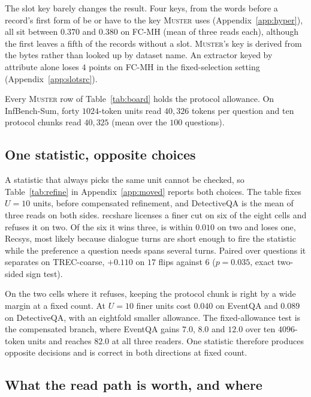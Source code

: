\documentclass{article}
\newcommand{\sys}{\textsc{Muster}}
\newcommand{\cov}{\textsf{recshare}}
\begin{document}
The slot key barely changes the result. Four keys, from the words before a record's first form of be or have
to the key \sys{} uses (Appendix~\ref{app:hyper}), all sit between $0.370$ and $0.380$ on FC-MH (mean of three reads each), although the first leaves a fifth of the records without a slot. \sys{}'s key is derived from the bytes rather than looked up by dataset name.
An extractor keyed by attribute alone loses $4$ points on FC-MH in the fixed-selection setting (Appendix~\ref{app:slotsrc}).

Every \sys{} row of Table~\ref{tab:board} holds the protocol allowance. On InfBench-Sum, forty
$1024$-token units read $40{,}326$ tokens per question and ten protocol chunks read $40{,}325$ (mean over the
$100$ questions).

\subsection{One statistic, opposite choices}


A statistic that always picks the same unit cannot be checked, so Table~\ref{tab:refine} in
Appendix~\ref{app:moved} reports both choices. The table fixes $U=10$ units, before compensated refinement, and DetectiveQA is the mean of three reads on both sides. \cov{} licenses a finer cut on six of the eight cells and
refuses it on two. Of the six it wins three, is within $0.010$ on two and loses one, Recsys, most likely
because dialogue turns are short enough to fire the statistic while the preference a question needs
spans several turns. Paired over questions it separates on TREC-coarse, $+0.110$ on $17$
flips against $6$ ($p = 0.035$, exact two-sided sign test).

On the two cells where it refuses, keeping the protocol chunk is right by a wide margin at a fixed count. At $U=10$ finer units cost $0.040$ on EventQA and $0.089$ on DetectiveQA, with an eightfold
smaller allowance. The fixed-allowance test is the compensated branch, where EventQA gains $7.0$, $8.0$ and $12.0$ over ten $4096$-token units and reaches $82.0$ at all three readers. One statistic therefore produces opposite decisions and is correct in both directions at fixed
count.

\subsection{What the read path is worth, and where}
\end{document}
